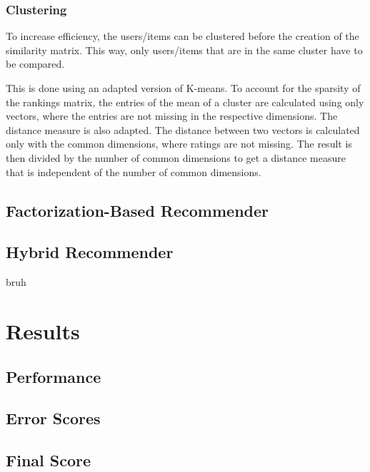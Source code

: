 \documentclass[12pt]{scrartcl}
\begin{document}
\subsubsection{Clustering}
To increase efficiency, the users/items can be clustered before the creation of the similarity matrix. This way, only users/items that are in the same cluster have to be compared.

This is done using an adapted version of K-means.
To account for the sparsity of the rankings matrix, the entries of the mean of a cluster are calculated using only vectors, where the entries are not missing in the respective dimensions.
The distance measure is also adapted. The distance between two vectors is calculated only with the common dimensions, where ratings are not missing.
The result is then divided by the number of common dimensions to get a distance measure that is independent of the number of common dimensions.


\subsection[Factorization]{Factorization-Based Recommender}


\subsection[Hybrid]{Hybrid Recommender}
bruh

\section{Results}
\subsection{Performance}
\subsection{Error Scores}
\subsection{Final Score}



\end{document}
